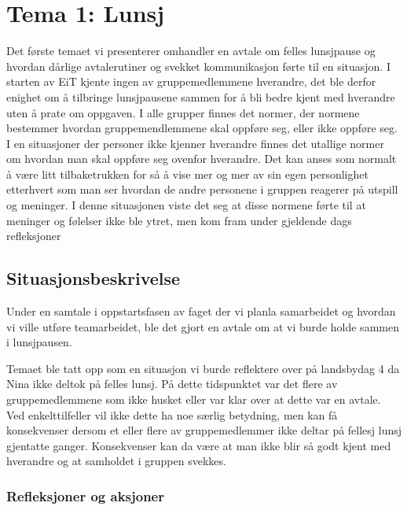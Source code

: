 \chapter{Tema 1: Lunsj}


Det første temaet vi presenterer omhandler en avtale om felles lunsjpause og hvordan dårlige avtalerutiner og svekket kommunikasjon førte til en situasjon. I starten av EiT kjente ingen av gruppemedlemmene hverandre, det ble derfor enighet om å tilbringe lunsjpausene sammen for å bli bedre kjent med hverandre uten å prate om oppgaven. I alle grupper finnes det normer, der normene bestemmer hvordan gruppemendlemmene skal oppføre seg, eller ikke oppføre seg. \cite{Artikkel2} I en situasjoner der personer ikke kjenner hverandre finnes det utallige normer om hvordan man skal oppføre seg ovenfor hverandre. Det kan anses som normalt å være litt tilbaketrukken for så å vise mer og mer av sin egen personlighet etterhvert som man ser hvordan de andre personene i gruppen reagerer på utspill og meninger. I denne situasjonen viste det seg at disse normene førte til at meninger og følelser ikke ble ytret, men kom fram under gjeldende dags refleksjoner

\section{Situasjonsbeskrivelse}

Under en samtale i oppstartsfasen av faget der vi planla samarbeidet og hvordan vi ville utføre teamarbeidet, ble det gjort en avtale om at vi burde holde sammen i lunsjpausen.


Temaet ble tatt opp som en situasjon vi burde reflektere over på landsbydag 4 da Nina ikke deltok på felles lunsj. På dette tidspunktet var det flere av gruppemedlemmene som ikke husket eller var klar over at dette var en avtale. Ved enkelttilfeller vil ikke dette ha noe særlig betydning, men kan få konsekvenser dersom et eller flere av gruppemedlemmer ikke deltar på fellesj lunsj gjentatte ganger. Konsekvenser kan da være at man ikke blir så godt kjent med hverandre og at samholdet i gruppen svekkes. 

\subsection*{Refleksjoner og aksjoner}

